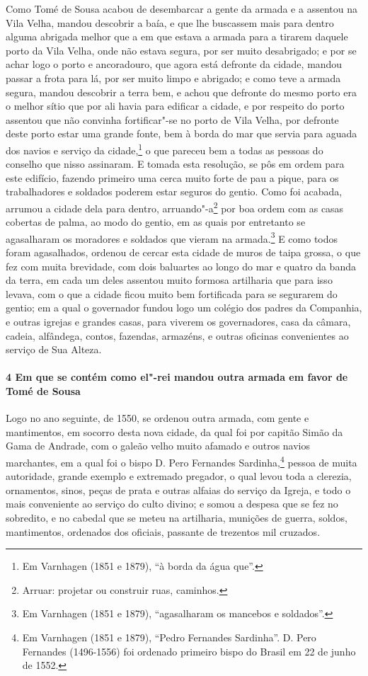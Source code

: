 Como Tomé de Sousa acabou de desembarcar a gente da armada e a assentou na Vila Velha,
mandou descobrir a baía, e que lhe buscassem mais para dentro alguma abrigada melhor que a
em que estava a armada para a tirarem daquele porto da Vila Velha, onde não estava segura,
por ser muito desabrigado; e por se achar logo o porto e ancoradouro, que agora está
defronte da cidade, mandou passar a frota para lá, por ser muito limpo e abrigado; e como
teve a armada segura, mandou descobrir a terra bem, e achou que defronte do mesmo porto
era o melhor sítio que por ali havia para edificar a cidade, e por respeito do porto
assentou que não convinha fortificar"-se no porto de Vila Velha, por defronte deste porto
estar uma grande fonte, bem à borda do mar que servia para aguada dos navios e serviço da
cidade,\footnote{ Em Varnhagen (1851 e 1879), ``à borda da água que''.} o que pareceu bem
a todas as pessoas do conselho que nisso assinaram. E tomada esta resolução, se pôs em
ordem para este edifício, fazendo primeiro uma cerca muito forte de pau a pique, para os
trabalhadores e soldados poderem estar seguros do gentio. Como foi acabada, arrumou a
cidade dela para dentro, arruando"-a\footnote{ Arruar: projetar ou construir ruas,
caminhos.} por boa ordem com as casas cobertas de palma, ao modo do gentio, em 
as quais por entretanto se agasalharam os moradores e soldados que vieram na
armada.\footnote{ Em Varnhagen (1851 e 1879), ``agasalharam os mancebos e soldados''.} E
como todos foram agasalhados, ordenou de cercar esta cidade de muros de taipa grossa, o
que fez com muita brevidade, com dois baluartes ao longo do mar e quatro da banda da
terra, em cada um deles assentou muito formosa artilharia que para isso levava, com o que
a cidade ficou muito bem fortificada para se segurarem do gentio; em a qual o governador
fundou logo um colégio dos padres da Companhia, e outras igrejas e grandes casas, para
viverem os governadores, casa da câmara, cadeia, alfândega, contos, fazendas, armazéns, e
outras oficinas convenientes ao serviço de Sua Alteza.

\paragraph{4 Em que se contém como el"-rei mandou outra armada em favor de Tomé de Sousa}

Logo no ano seguinte, de 1550, se ordenou outra armada, com gente e mantimentos, em
socorro desta nova cidade, da qual foi por capitão Simão da Gama de Andrade, com o galeão
velho muito afamado e outros navios marchantes, em a qual foi o bispo D. Pero Fernandes
Sardinha,\footnote{ Em Varnhagen (1851 e 1879), ``Pedro Fernandes Sardinha''. D. Pero
Fernandes (1496-1556) foi ordenado primeiro bispo do Brasil em 22 de junho de 1552.}
pessoa de muita autoridade, grande exemplo e extremado pregador, o qual levou toda a
clerezia, ornamentos, sinos, peças de prata e outras alfaias do serviço da Igreja, e todo
o mais conveniente ao serviço do culto divino; e somou a despesa que se fez no sobredito,
e no cabedal que se meteu na artilharia, munições de guerra, soldos, mantimentos,
ordenados dos oficiais, passante de trezentos mil cruzados.

